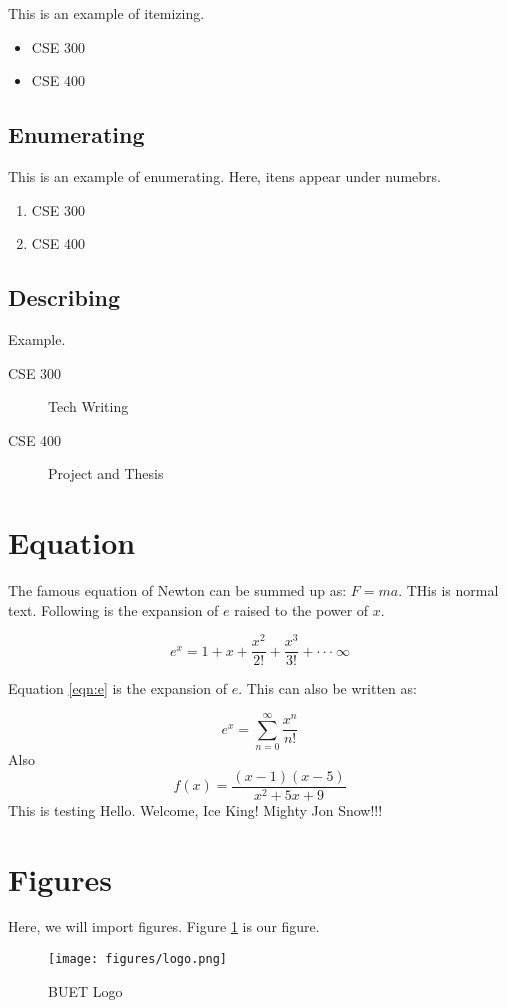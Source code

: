 \documentclass{book}
\newcommand{\testcommand}{Hello}
\newcommand{\anothertestcommand}[2]{Welcome, #2! Mighty #1!!!}
\begin{document}
This is an example of itemizing.

\begin{itemize}
    \item CSE 300
    \item CSE 400
\end{itemize}

\subsection{Enumerating}

This is an example of enumerating. Here, itens appear under numebrs.

\begin{enumerate}
    \item CSE 300
    \item CSE 400
\end{enumerate}

\subsection{Describing}

Example.

\begin{description}
    \item[CSE 300] Tech Writing \lipsum[1-1]
    \item[CSE 400] Project and Thesis
\end{description}


\section{Equation}

The famous equation of Newton can be summed up as: $F = ma$. THis is normal text. Following is the expansion of $e$ raised to the power of $x$.

\begin{equation}
    e ^ x = 1 + x + \frac{x ^ 2}{ 2 !} + \frac{x ^ 3}{3!} + \cdot \cdot \cdot ~ \infty
    \label{eqn:e}
\end{equation}

Equation \ref{eqn:e} is the expansion of $e$. This can also be written as:

\begin{equation}
    e ^ x = \sum_{n=0}^{\infty} \frac{x ^ n}{n !}
\end{equation}
Also $$f(x) = \frac{(x-1)(x-5)}{x^2+5x+9}$$
This is testing \testcommand. \anothertestcommand{Jon Snow}{Ice King}

\section{Figures}

Here, we will import figures. Figure \ref{fig:bl} is our figure.

\begin{figure}[h!]
    \centering
    \texttt{[image: figures/logo.png]}
    \caption{BUET Logo}
    \label{fig:bl}
\end{figure}

\lipsum
\end{document}
